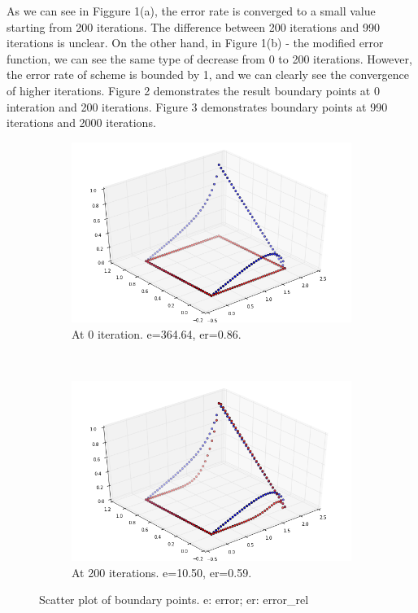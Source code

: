 \documentclass[a4paper,12pt]{article}
\begin{document}
As we can see in Figgure 1(a), the error rate is converged to a small value starting from 200 iterations. The difference between 200 iterations and 990 iterations is unclear. On the other hand, in Figure 1(b) - the modified error function, we can see the same type of decrease from 0 to 200 iterations. However, the error rate of scheme is bounded by 1, and we can clearly see the convergence of higher iterations. Figure 2 demonstrates the result boundary points at 0 interation and 200 iterations. Figure 3 demonstrates boundary points at 990 iterations and 2000 iterations.

\pagebreak

\begin{figure}[h!]
  \centering
  \begin{subfigure}[b]{0.48\textwidth}
    \includegraphics[width=\textwidth]{hpsc_a1_scat_0.png}
    \caption{At 0 iteration. e=364.64, er=0.86.}
  \end{subfigure}
~
\begin{subfigure}[b]{0.48\textwidth}
    \includegraphics[width=\textwidth]{hpsc_a1_scat_20.png}
    \caption{At 200 iterations. e=10.50, er=0.59.}
  \end{subfigure}
  \caption{Scatter plot of boundary points. e: error; er: error\_rel}
\end{figure}
\end{document}
